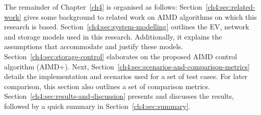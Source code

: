 The remainder of Chapter~\ref{ch4} is organised as follows:
Section~\ref{ch4:sec:related-work} gives some background to related work on AIMD algorithms on which this research is based.
Section~\ref{ch4:sec:system-modelling} outlines the EV, network and storage models used in this research.
Additionally, it explains the assumptions that accommodate and justify these models.
Section~\ref{ch4:sec:storage-control} elaborates on the proposed AIMD control algorithm (AIMD+).
Next, Section~\ref{ch4:sec:scenarios-and-comparison-metrics} details the implementation and scenarios used for a set of test cases.
For later comparison, this section also outlines a set of comparison metrics.
Section~\ref{ch4:sec:results-and-discussion} presents and discusses the results, followed by a quick summary in Section~\ref{ch4:sec:summary}.


